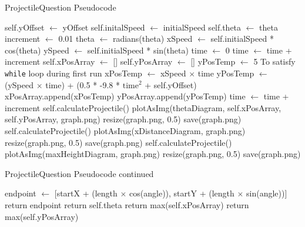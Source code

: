 \begin{algorithm}[H]
	\label{projectilequestionps}
	\caption{ProjectileQuestion Pseudocode}
	\begin{algorithmic}[1]
		 {}
		\State self.yOffset $\gets$ yOffset
		\State self.initalSpeed $\gets$ initialSpeed
		\State self.theta $\gets$ theta
		\EndFunction
		\State increment $\gets$ 0.01
		\State theta $\gets$ radians(theta)
		\State xSpeed $\gets$ self.initialSpeed * cos(theta)
		\State ySpeed $\gets$ self.initialSpeed * sin(theta)
		\State time $\gets$ 0
		\State time $\gets$ time + increment
		\State self.xPosArray $\gets$ []
		\State self.yPosArray $\gets$ []
		\State yPosTemp $\gets$ 5 \Comment To satisfy \texttt{while} loop during first run
		\State xPosTemp $\gets$ xSpeed $\times$ time
		\State yPosTemp $\gets$ (ySpeed $\times$ time) + (0.5 * -9.8 * $\textrm{time}^2$ + self.yOffset) 
		\State xPosArray.append(xPosTemp)
		\State yPosArray.append(yPosTemp)
		\State time $\gets$ time + increment
		\EndWhile
		\EndFunction
		\State self.calculateProjectile()
		\State plotAsImg(thetaDiagram, self.xPosArray, self.yPosArray, graph.png)
		\State resize(graph.png, 0.5)
		\State save(graph.png)
		\EndFunction
		\State self.calculateProjectile()
		\State plotAsImg(xDistanceDiagram, graph.png)
		\State resize(graph.png, 0.5)
		\State save(graph.png)
		\EndFunction
		\State self.calculateProjectile()
		\State plotAsImg(maxHeightDiagram, graph.png)
		\State resize(graph.png, 0.5)
		\State save(graph.png)
		\EndFunction
		
	\end{algorithmic}
\end{algorithm}
\clearpage
\begin{algorithm}[H]
	\caption{ProjectileQuestion Pseudocode continued}
	\begin{algorithmic}[1]
		\State endpoint $\gets$ [startX + (length $\times$ cos(angle)), startY + (length $\times$ sin(angle))]
		\State return endpoint
		\EndFunction
		\State return self.theta
		\EndFunction 
		\State return max(self.xPosArray)
		\EndFunction
		\State return max(self.yPosArray)
		\EndFunction
		\EndProcedure
	\end{algorithmic}
\end{algorithm}
